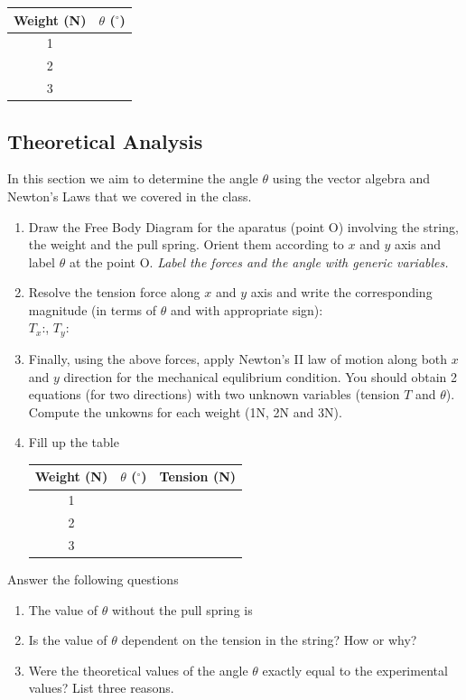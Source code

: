 \documentclass[10pt]{article}
\begin{document}
\begin{center}
 \begin{tabular}{||c c||} 
 \hline
 Weight (N) & $\theta$ ($^{\circ}$) \\ [0.5ex] 
 \hline\hline
 1 &   \\ 
 \hline
 2 &  \\
\hline
 3 & \\
\hline
\end{tabular}
\end{center}
\subsection{Theoretical Analysis}
In this section we aim to determine the angle $\theta$ using the vector algebra and Newton's Laws that we covered in the class.
\begin{enumerate}
\item Draw the Free Body Diagram for the aparatus (point O) involving the string, the weight and the pull spring.  Orient them according to $x$ and $y$ axis and label $\theta$ at the point O.
\emph{Label the forces and the angle with generic variables.}
\vspace{250px}
\item Resolve the tension force along $x$ and $y$ axis and write the corresponding magnitude (in terms of $\theta$ and with appropriate sign):\\
$T_x$:\underline{\hspace{5cm}}, $T_y$:\underline{\hspace{5cm}}
\item Finally, using the above forces, apply Newton's II law of motion along both $x$ and $y$ direction for the mechanical equlibrium condition.  You should obtain 2 equations (for two directions) with two unknown variables (tension $T$ and $\theta$).  Compute the unkowns for each weight (1N, 2N and 3N).
\vspace{500px}
\item Fill up the table
\begin{center}
 \begin{tabular}{||c c c||} 
 \hline
 Weight (N) & $\theta$ ($^{\circ}$) & Tension (N)\\ [0.5ex] 
 \hline\hline
 1 &  & \\ 
 \hline
 2 &  &\\
\hline
 3 & &\\
\hline
\end{tabular}
\end{center}
\end{enumerate}
Answer the following questions
\begin{enumerate}
\item The value of $\theta$ without the pull spring is \underline{\hspace{3cm}}
\item Is the value of $\theta$ dependent on the tension in the string? How or why?
\item Were the theoretical values of the angle $\theta$ exactly equal to the experimental values?  List three reasons.
\end{enumerate}
\end{document}

